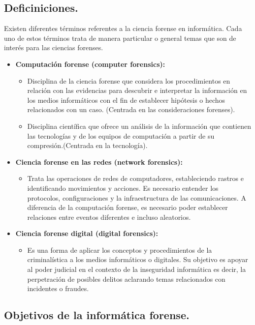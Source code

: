 \subsection{Deficiniciones.}

Existen diferentes términos referentes a la ciencia forense en informática. Cada uno de estos términos trata de manera particular o general temas que son de interés para las ciencias forenses.

\begin{itemize}
    \item \textbf{Computación forense (computer forensics):}
    \begin{itemize}
        \item Disciplina de la ciencia forense que considera los procedimientos en relación con las evidencias para descubrir e interpretar la información en los medios informáticos con el fin de establecer hipótesis o hechos relacionados con un caso. (Centrada en las consideraciones forenses).
        \item Disciplina científica que ofrece un análisis de la información que contienen las tecnologías y de los equipos de computación a partir de su compresión.(Centrada en la tecnología).
    \end{itemize}
    \item \textbf{Ciencia forense en las redes (network forensics):}
    \begin{itemize}
        \item Trata las operaciones de redes de computadores, estableciendo rastros e identificando movimientos y acciones. Es necesario entender los protocolos, configuraciones y la infraestructura de las comunicaciones. A diferencia de la computación forense, es necesario poder establecer relaciones entre eventos diferentes e incluso aleatorios.
    \end{itemize}
    \item \textbf{Ciencia forense digital (digital forensics):}
    \begin{itemize}
        \item Es una forma de aplicar los conceptos y procedimientos de la criminalística a los medios informáticos o digitales. Su objetivo es apoyar al poder judicial en el contexto de la inseguridad informática es decir, la perpetración de posibles delitos aclarando temas relacionados con incidentes o fraudes.
    \end{itemize}
\end{itemize}

\subsection{Objetivos de la informática forense.}

